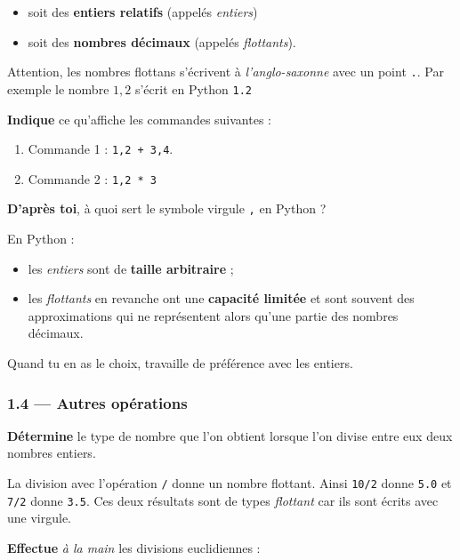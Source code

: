 \documentclass[a4paper,17pt]{extarticle}
\providecommand{\tightlist}{%
      \setlength{\itemsep}{0pt}\setlength{\parskip}{0pt}}
\begin{document}
\begin{itemize}
\tightlist
\item
  soit des \textbf{entiers relatifs} (appelés \emph{entiers})
\item
  soit des \textbf{nombres décimaux} (appelés \emph{flottants}).
\end{itemize}

    Attention, les nombres flottans s'écrivent à \emph{l'anglo-saxonne} avec
un point \texttt{.}. Par exemple le nombre \(1,2\) s'écrit en Python
\texttt{1.2}

    \textbf{Indique} ce qu'affiche les commandes suivantes :

\begin{enumerate}
\def\labelenumi{\arabic{enumi}.}
\tightlist
\item
  Commande 1 : \texttt{1,2\ +\ 3,4}.
\item
  Commande 2 : \texttt{1,2\ *\ 3}
\end{enumerate}

\textbf{D'après toi}, à quoi sert le symbole virgule \texttt{,} en
Python ?

    En Python :

\begin{itemize}
\tightlist
\item
  les \emph{entiers} sont de \textbf{taille arbitraire} ;
\item
  les \emph{flottants} en revanche ont une \textbf{capacité limitée} et
  sont souvent des approximations qui ne représentent alors qu'une
  partie des nombres décimaux.
\end{itemize}

Quand tu en as le choix, travaille de préférence avec les entiers.

    \hypertarget{autres-opuxe9rations}{%
\subsubsection{1.4 --- Autres opérations}\label{autres-opuxe9rations}}

    \textbf{Détermine} le type de nombre que l'on obtient lorsque l'on
divise entre eux deux nombres entiers.

    La division avec l'opération \texttt{/} donne un nombre flottant. Ainsi
\texttt{10/2} donne \texttt{5.0} et \texttt{7/2} donne \texttt{3.5}. Ces
deux résultats sont de types \emph{flottant} car ils sont écrits avec
une virgule.

    \textbf{Effectue} \emph{à la main} les divisions euclidiennes :
\end{document}
